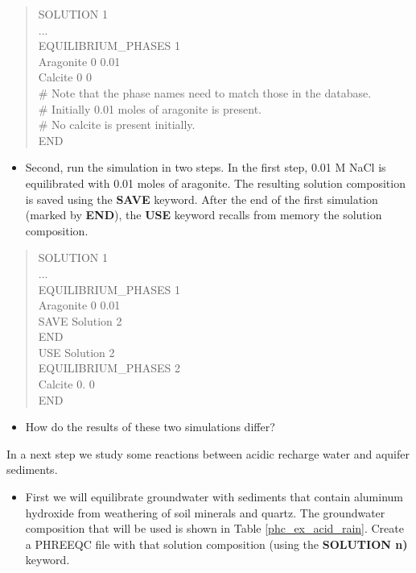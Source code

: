 \begin{quote}
{\color{red}SOLUTION 1 \\
... \\
EQUILIBRIUM\_PHASES 1 \\
Aragonite  0 0.01 \\
Calcite  0  0 \\
\# Note that the phase names need to match those in the database. \\
\# Initially 0.01 moles of aragonite is present. \\
\# No calcite is present initially. \\
END}
\end{quote}

\begin{itemize}
\item Second, run the simulation in two steps. In the first step, 0.01 M NaCl is equilibrated with 0.01 moles of aragonite. The resulting solution composition is saved using the {\color{red} \textbf{SAVE}} keyword.  After the end of the first simulation (marked by {\color{red} \textbf{END}}), the {\color{red} \textbf{USE}} keyword recalls from memory the solution composition.
\end{itemize}

\begin{quote}
{\color{red}SOLUTION 1\\
...\\
EQUILIBRIUM\_PHASES 1 \\
Aragonite 0  0.01 \\
SAVE Solution 2 \\
END \\
USE Solution 2 \\
EQUILIBRIUM\_PHASES 2 \\
Calcite 0.  0 \\
END }\\
\end{quote}

\begin{itemize}
\item How do the results of these two simulations differ?
\end{itemize}


In a next step we study some reactions between acidic recharge water and aquifer sediments.

\begin{itemize}
\item First we will equilibrate groundwater with sediments that contain aluminum hydroxide 
from weathering of soil minerals and quartz. The groundwater composition that will be used 
is shown in Table \ref{phc_ex_acid_rain}. Create a PHREEQC file with that solution composition 
(using the {\color{red} \textbf{SOLUTION n)}} keyword.  
\end{itemize}

